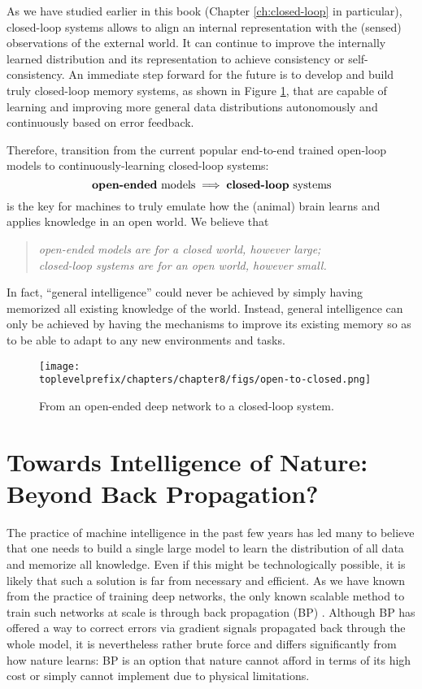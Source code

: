 \documentclass[../../book-main.tex]{subfiles}
\begin{document}
As we have studied earlier in this book (Chapter \ref{ch:closed-loop} in particular), closed-loop systems allows to align an internal representation with the (sensed) observations of the external world. It can continue to improve the internally learned distribution and its representation to achieve consistency or self-consistency. An immediate step forward for the future is to develop and build truly closed-loop memory systems, as shown in Figure \ref{fig:open-to-closed}, that are capable of learning and improving more general data distributions autonomously and continuously based on error feedback. 

Therefore, transition from the current popular end-to-end trained open-loop models to continuously-learning closed-loop systems:
\begin{equation}
   \mbox{\textbf{open-ended} models} \; \Longrightarrow \; 
   \mbox{\textbf{closed-loop} systems}
\end{equation}
is the key for machines to truly emulate how the (animal) brain learns and applies knowledge in an open world. We believe that
\begin{quote}
\begin{center}
        {\em open-ended models are for a closed world, however large; \\ closed-loop systems are for an open world, however small.}
\end{center}
\end{quote}
In fact, ``general intelligence'' could never be achieved by simply having memorized all existing knowledge of the world. Instead, general intelligence can only be achieved by having the mechanisms to improve its existing memory so as to be able to adapt to any new environments and tasks. 

\begin{figure}[t]
    \centering    
    \texttt{[image: \\toplevelprefix/chapters/chapter8/figs/open-to-closed.png]}
    \caption{From an open-ended deep network to a closed-loop system.}
    \label{fig:open-to-closed}
\end{figure}



\section{Towards Intelligence of Nature: Beyond Back Propagation?}
The practice of machine intelligence in the past few years has led many to believe that one needs to build a single large model to learn the distribution of all data and memorize all knowledge. Even if this might be technologically possible, it is likely that such a solution is far from necessary and efficient. As we have known from the practice of training deep networks, the only known scalable method to train such networks at scale is through back propagation (BP) \cite{Back-Prop}. Although BP has offered a way to correct errors via gradient signals propagated back through the whole model, it is nevertheless rather brute force and differs significantly from how nature learns: BP is an option that nature cannot afford in terms of its high cost or simply cannot implement due to physical limitations. 
\end{document}
